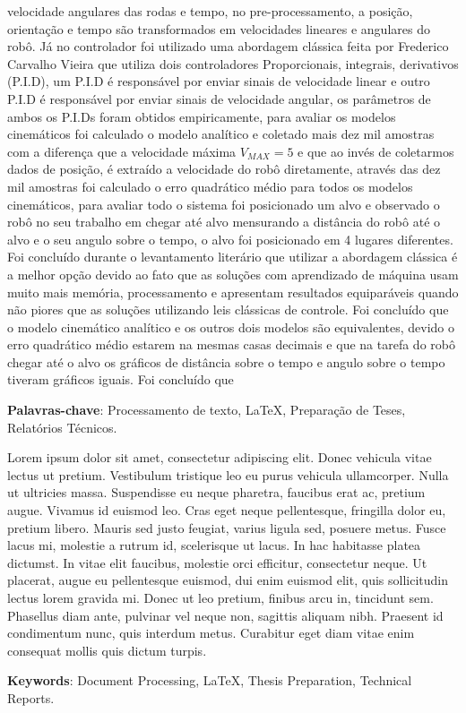 velocidade angulares das rodas e tempo, no pre-processamento, a posição,
orientação e tempo são transformados em velocidades lineares e angulares
do robô. Já no controlador foi utilizado uma abordagem clássica feita por
Frederico Carvalho Vieira que utiliza dois controladores
Proporcionais, integrais, derivativos (P.I.D), um P.I.D é
responsável por enviar sinais de velocidade linear
e outro P.I.D é responsável por enviar sinais de velocidade angular, os parâmetros
de ambos os P.I.Ds foram obtidos empiricamente, para avaliar os modelos cinemáticos
foi calculado o modelo analítico e coletado mais dez mil amostras com a diferença que a
velocidade máxima $V_{MAX}=5$ e que ao invés de coletarmos dados de posição,
é extraído a velocidade do robô diretamente, através das dez mil amostras
foi calculado o erro quadrático médio para todos os modelos cinemáticos,
para avaliar todo o sistema foi posicionado um alvo e observado o robô no seu
trabalho em chegar até alvo mensurando a distância do robô até o alvo e o seu
angulo sobre o tempo, o alvo foi posicionado em 4 lugares diferentes.
Foi concluído durante o levantamento literário que utilizar a abordagem
clássica é a melhor opção devido ao fato que as soluções com
aprendizado de máquina usam muito mais memória, processamento e
apresentam resultados equiparáveis quando não piores que as soluções
utilizando leis clássicas de controle. Foi concluído que o modelo cinemático
analítico e os outros dois modelos são equivalentes, devido o erro quadrático
médio estarem na mesmas casas decimais e que na tarefa do robô chegar até o alvo
os gráficos de distância sobre o tempo e angulo sobre o tempo tiveram gráficos
iguais. Foi concluído que 



\vspace{1.5ex}

{\bf Palavras-chave}: Processamento de texto, \LaTeX,
Preparação de Teses, Relatórios Técnicos.

%
%

Lorem ipsum dolor sit amet, consectetur adipiscing elit. Donec vehicula vitae lectus ut pretium. Vestibulum tristique leo eu purus vehicula ullamcorper. Nulla ut ultricies massa. Suspendisse eu neque pharetra, faucibus erat ac, pretium augue. Vivamus id euismod leo. Cras eget neque pellentesque, fringilla dolor eu, pretium libero. Mauris sed justo feugiat, varius ligula sed, posuere metus. Fusce lacus mi, molestie a rutrum id, scelerisque ut lacus. In hac habitasse platea dictumst. In vitae elit faucibus, molestie orci efficitur, consectetur neque. Ut placerat, augue eu pellentesque euismod, dui enim euismod elit, quis sollicitudin lectus lorem gravida mi. Donec ut leo pretium, finibus arcu in, tincidunt sem. Phasellus diam ante, pulvinar vel neque non, sagittis aliquam nibh. Praesent id condimentum nunc, quis interdum metus. Curabitur eget diam vitae enim consequat mollis quis dictum turpis.

\vspace{1.5ex}

{\bf Keywords}: Document Processing, \LaTeX, Thesis Preparation,
Technical Reports.
